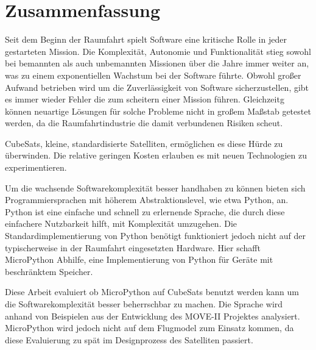\cleardoublepage
\section*{Zusammenfassung}

Seit dem Beginn der Raumfahrt spielt Software eine kritische Rolle in jeder gestarteten Mission. Die Komplexität, Autonomie und Funktionalität stieg sowohl bei bemannten als auch unbemannten Missionen über die Jahre immer weiter an, was zu einem exponentiellen Wachstum bei der Software führte.
Obwohl großer Aufwand betrieben wird um die Zuverlässigkeit von Software sicherzustellen, gibt es immer wieder Fehler die zum scheitern einer Mission führen. Gleichzeitg können neuartige Lösungen für solche Probleme nicht in großem Maßstab getestet werden, da die Raumfahrtindustrie die damit verbundenen Risiken scheut.

CubeSats, kleine, standardisierte Satelliten, ermöglichen es diese Hürde zu überwinden. Die relative geringen Kosten erlauben es mit neuen Technologien zu experimentieren.

Um die wachsende Softwarekomplexität besser handhaben zu können bieten sich Programmiersprachen mit höherem Abstraktionslevel, wie etwa Python, an. Python ist eine einfache und schnell zu erlernende Sprache, die durch diese einfachere Nutzbarkeit hilft, mit Komplexität umzugehen. Die Standardimplementierung von Python benötigt funktioniert jedoch nicht auf der typischerweise in der Raumfahrt eingesetzten Hardware. Hier schafft MicroPython Abhilfe, eine Implementierung von Python für Geräte mit beschränktem Speicher.

Diese Arbeit evaluiert ob MicroPython auf CubeSats benutzt werden kann um die Softwarekomplexität besser beherrschbar zu machen. Die Sprache wird anhand von Beispielen aus der Entwicklung des MOVE-II Projektes analysiert. MicroPython wird jedoch nicht auf dem Flugmodel zum Einsatz kommen, da diese Evaluierung zu spät im Designprozess des Satelliten passiert.

